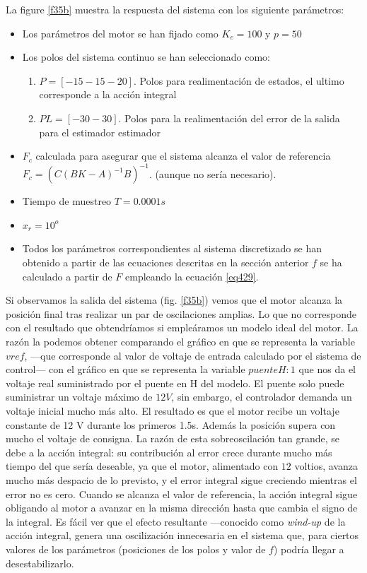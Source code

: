 \documentclass[10pt,a4paper]{report}
\begin{document}
La figure \ref{f35b} muestra la respuesta del sistema con los siguiente parámetros: 
\begin{itemize}
\item Los parámetros del motor se han fijado como $K_e = 100$ y $p =50$
\item Los polos del sistema continuo se han seleccionado como:
\begin{enumerate}
\item $P = [-15 -15 -20]$. Polos para realimentación de estados, el ultimo corresponde a la acción integral
\item $PL = [-30 -30]$.  Polos para la realimentación del error  de la salida para el estimador estimador 
\end{enumerate}
\item $F_c$ calculada para asegurar que el sistema alcanza el valor de referencia $F_c = (C(BK-A)^{-1}B)^{-1}$. (aunque no sería necesario). 
\item Tiempo de muestreo $T=0.0001s$
\item $x_r = 10^o$
\item Todos los parámetros correspondientes al sistema discretizado se han obtenido a partir de las ecuaciones descritas en la sección anterior $f$ se ha calculado a partir de $F$ empleando la ecuación \ref{eq429}.
\end{itemize}

Si observamos la salida del sistema (fig. \ref{f35b}) vemos que el motor alcanza la posición final tras realizar un par de oscilaciones amplias. Lo que no corresponde con el resultado que obtendríamos si empleáramos un modelo ideal del motor. La razón la podemos obtener comparando el gráfico en que se representa la variable $vref$, ---que corresponde al valor de voltaje de entrada calculado por el sistema de control---  con  el gráfico en que se representa la variable $puente H:1$ que nos da el voltaje real suministrado por el puente en H del modelo. El puente solo puede suministrar un voltaje máximo de $12V$, sin embargo, el controlador demanda un voltaje inicial mucho más alto. El resultado es que el motor recibe un voltaje constante de 12 V durante los primeros 1.5s. Además la posición supera con mucho el voltaje de consigna. La razón de esta sobreoscilación tan grande, se debe a la acción integral: su contribución al error crece durante mucho más tiempo del que sería deseable, ya que el motor, alimentado con $12$ voltios, avanza mucho más despacio de lo previsto, y el error integral sigue creciendo mientras el error no es cero. Cuando se alcanza el valor de referencia, la acción integral sigue obligando al motor a avanzar en la misma dirección hasta que cambia el signo de la integral. Es fácil ver que el efecto resultante ---conocido como \emph{wind-up} de la acción integral, genera una oscilización innecesaria en el sistema que, para ciertos valores de los parámetros (posiciones de los polos y valor de $f$) podría llegar a desestabilizarlo.
\end{document}
